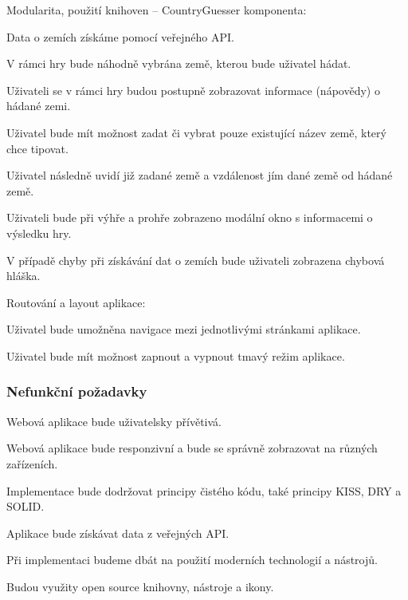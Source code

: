 \begin{citemize}
	\item Modularita, použití knihoven -- CountryGuesser komponenta:
	
	\begin{cenumerate}
		\item Data o zemích získáme pomocí veřejného API.
		\item V rámci hry bude náhodně vybrána země, kterou bude uživatel hádat.
		\item Uživateli se v rámci hry budou postupně zobrazovat informace (nápovědy) o hádané zemi.
		\item Uživatel bude mít možnost zadat či vybrat pouze existující název země, který chce tipovat.
		\item Uživatel následně uvidí již zadané země a vzdálenost jím dané země od hádané země.
		\item Uživateli bude při výhře a prohře zobrazeno modální okno s informacemi o výsledku hry.
		\item V případě chyby při získávání dat o zemích bude uživateli zobrazena chybová hláška.
	\end{cenumerate}

	\item Routování a layout aplikace:
	
	\begin{cenumerate}
		\item Uživatel bude umožněna navigace mezi jednotlivými stránkami aplikace.
		\item Uživatel bude mít možnost zapnout a vypnout tmavý režim aplikace.
	\end{cenumerate}
\end{citemize}

\subsubsection{Nefunkční požadavky}

\begin{citemize}
	\item Webová aplikace bude uživatelsky přívětivá.
	\item Webová aplikace bude responzivní a bude se správně zobrazovat na různých zařízeních.
	\item Implementace bude dodržovat principy čistého kódu, také principy KISS, DRY a SOLID.
	\item Aplikace bude získávat data z veřejných API.
	\item Při implementaci budeme dbát na použití moderních technologií a nástrojů.
	\item Budou využity open source knihovny, nástroje a ikony. 
\end{citemize}

